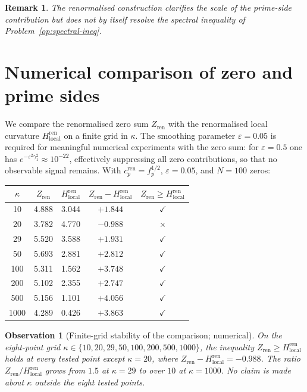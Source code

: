 \documentclass[11pt]{article}
\newtheorem{observation}[theorem]{Observation}
\newtheorem*{remark}{Remark}
\newcommand{\Hren}{H_{\mathrm{local}}^{\mathrm{ren}}}
\newcommand{\cren}{c_p^{\mathrm{ren}}}
\newcommand{\Zren}{Z_{\mathrm{ren}}}
\begin{document}
\begin{remark}
The renormalised construction clarifies the scale of the
prime-side contribution but does not by itself resolve the
spectral inequality of Problem~\ref{op:spectral-ineq}.
\end{remark}

\section{Numerical comparison of zero and prime sides}
\label{sec:numerical}

We compare the renormalised zero sum $\Zren$ with the
renormalised local curvature $\Hren$ on a finite grid in
$\kappa$.
The smoothing parameter $\varepsilon=0.05$ is required for
meaningful numerical experiments with the zero sum: for
$\varepsilon=0.5$ one has $e^{-\varepsilon^2\gamma_1^2}\approx
10^{-22}$, effectively suppressing all zero contributions, so
that no observable signal remains.
With $\cren=f_p^{1/2}$, $\varepsilon=0.05$, and $N=100$ zeros:

\begin{center}
\begin{tabular}{ccccc}
\toprule
$\kappa$ & $\Zren$ & $\Hren$
         & $\Zren-\Hren$ & $\Zren\ge\Hren$ \\
\midrule
10   & 4.888 & 3.044 & $+1.844$ & $\checkmark$ \\
20   & 3.782 & 4.770 & $-0.988$ & $\times$ \\
29   & 5.520 & 3.588 & $+1.931$ & $\checkmark$ \\
50   & 5.693 & 2.881 & $+2.812$ & $\checkmark$ \\
100  & 5.311 & 1.562 & $+3.748$ & $\checkmark$ \\
200  & 5.102 & 2.355 & $+2.747$ & $\checkmark$ \\
500  & 5.156 & 1.101 & $+4.056$ & $\checkmark$ \\
1000 & 4.289 & 0.426 & $+3.863$ & $\checkmark$ \\
\bottomrule
\end{tabular}
\end{center}

\begin{observation}[Finite-grid stability of the comparison; numerical]\label{obs:Z-vs-H}
On the eight-point grid
$\kappa\in\{10,20,29,50,100,200,500,1000\}$, the inequality
$\Zren\ge\Hren$ holds at every tested point except $\kappa=20$,
where $\Zren-\Hren=-0.988$.
The ratio $\Zren/\Hren$ grows from $1.5$ at $\kappa=29$ to
over $10$ at $\kappa=1000$.
No claim is made about $\kappa$ outside the eight tested points.
\end{observation}
\end{document}

